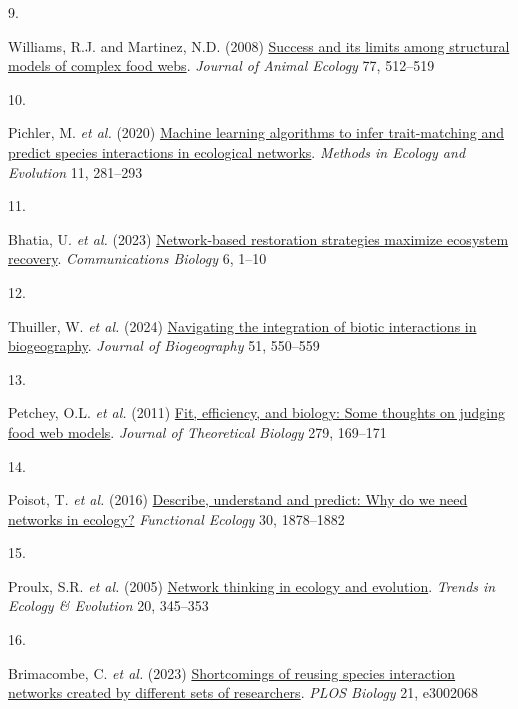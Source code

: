\documentclass[
]{article}
\newlength{\cslhangindent}
\newlength{\csllabelwidth}
\newenvironment{CSLReferences}[2] %
 {\begin{list}{}{%
  \setlength{\itemindent}{0pt}
  \setlength{\leftmargin}{0pt}
  \setlength{\parsep}{0pt}
  \ifodd #1
   \setlength{\leftmargin}{\cslhangindent}
   \setlength{\itemindent}{-1\cslhangindent}
  \fi
  \setlength{\itemsep}{#2\baselineskip}}}
 {\end{list}}
\newcommand{\CSLLeftMargin}[1]{\parbox[t]{\csllabelwidth}{\strut#1\strut}}
\newcommand{\CSLRightInline}[1]{\parbox[t]{\linewidth - \csllabelwidth}{\strut#1\strut}}
\begin{document}
\begin{CSLReferences}{0}{0}
\CSLLeftMargin{9. }%
\CSLRightInline{Williams, R.J. and Martinez, N.D. (2008)
\href{https://doi.org/10.1111/j.1365-2656.2008.01362.x}{Success and its
limits among structural models of complex food webs}. \emph{Journal of
Animal Ecology} 77, 512--519}

\CSLLeftMargin{10. }%
\CSLRightInline{Pichler, M. \emph{et al.} (2020)
\href{https://doi.org/10.1111/2041-210X.13329}{Machine learning
algorithms to infer trait-matching and predict species interactions in
ecological networks}. \emph{Methods in Ecology and Evolution} 11,
281--293}

\CSLLeftMargin{11. }%
\CSLRightInline{Bhatia, U. \emph{et al.} (2023)
\href{https://doi.org/10.1038/s42003-023-05622-3}{Network-based
restoration strategies maximize ecosystem recovery}.
\emph{Communications Biology} 6, 1--10}

\CSLLeftMargin{12. }%
\CSLRightInline{Thuiller, W. \emph{et al.} (2024)
\href{https://doi.org/10.1111/jbi.14734}{Navigating the integration of
biotic interactions in biogeography}. \emph{Journal of Biogeography} 51,
550--559}

\CSLLeftMargin{13. }%
\CSLRightInline{Petchey, O.L. \emph{et al.} (2011)
\href{https://doi.org/10.1016/j.jtbi.2011.03.019}{Fit, efficiency, and
biology: {Some} thoughts on judging food web models}. \emph{Journal of
Theoretical Biology} 279, 169--171}

\CSLLeftMargin{14. }%
\CSLRightInline{Poisot, T. \emph{et al.} (2016)
\href{https://www.jstor.org/stable/48582345}{Describe, understand and
predict: Why do we need networks in ecology?} \emph{Functional Ecology}
30, 1878--1882}

\CSLLeftMargin{15. }%
\CSLRightInline{Proulx, S.R. \emph{et al.} (2005)
\href{https://doi.org/10.1016/j.tree.2005.04.004}{Network thinking in
ecology and evolution}. \emph{Trends in Ecology \& Evolution} 20,
345--353}

\CSLLeftMargin{16. }%
\CSLRightInline{Brimacombe, C. \emph{et al.} (2023)
\href{https://doi.org/10.1371/journal.pbio.3002068}{Shortcomings of
reusing species interaction networks created by different sets of
researchers}. \emph{PLOS Biology} 21, e3002068}


\end{CSLReferences}
\end{document}
